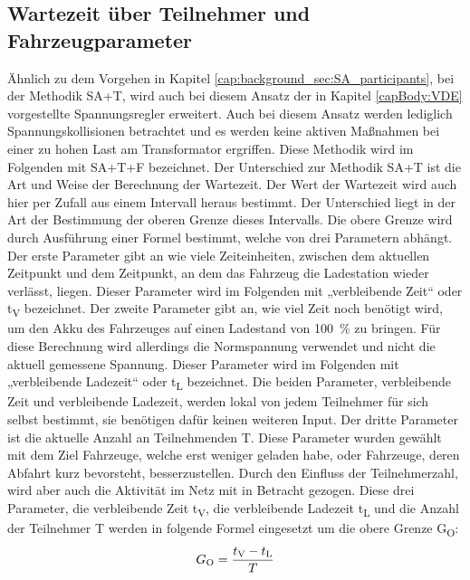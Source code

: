 \subsection{Wartezeit über Teilnehmer und Fahrzeugparameter}
\label{cap:background_sec:SA_waitingTime}
Ähnlich zu dem Vorgehen in Kapitel \ref{cap:background_sec:SA_participants}, bei der Methodik SA+T, wird auch bei diesem Ansatz der in Kapitel \ref{capBody:VDE} vorgestellte Spannungsregler erweitert. Auch bei diesem Ansatz werden lediglich Spannungskollisionen betrachtet und es werden keine aktiven Maßnahmen bei einer zu hohen Last am Transformator ergriffen. Diese Methodik wird im Folgenden mit SA+T+F bezeichnet. Der Unterschied zur Methodik SA+T ist die Art und Weise der Berechnung der Wartezeit. Der Wert der Wartezeit wird auch hier per Zufall aus einem Intervall heraus bestimmt. Der Unterschied liegt in der Art der Bestimmung der oberen Grenze dieses Intervalls. Die obere Grenze wird durch Ausführung einer Formel bestimmt, welche von drei Parametern abhängt.  Der erste Parameter gibt an wie viele Zeiteinheiten, zwischen dem aktuellen Zeitpunkt und dem Zeitpunkt, an dem das Fahrzeug die Ladestation wieder verlässt, liegen. Dieser Parameter wird im Folgenden mit „verbleibende Zeit“ oder t\textsubscript{V} bezeichnet. Der zweite Parameter gibt an, wie viel Zeit noch benötigt wird, um den Akku des Fahrzeuges auf einen Ladestand von 100~\% zu bringen. Für diese Berechnung wird allerdings die Normspannung verwendet und nicht die aktuell gemessene Spannung. Dieser Parameter wird im Folgenden mit „verbleibende Ladezeit“ oder t\textsubscript{L} bezeichnet. Die beiden Parameter, verbleibende Zeit und verbleibende Ladezeit, werden lokal von jedem Teilnehmer für sich selbst bestimmt, sie benötigen dafür keinen weiteren Input. Der dritte Parameter ist die aktuelle Anzahl an Teilnehmenden T. Diese Parameter wurden gewählt mit dem Ziel Fahrzeuge, welche erst weniger geladen habe, oder Fahrzeuge, deren Abfahrt kurz bevorsteht, besserzustellen. Durch den Einfluss der Teilnehmerzahl, wird aber auch die Aktivität im Netz mit in Betracht gezogen. Diese drei Parameter, die verbleibende Zeit t\textsubscript{V}, die verbleibende Ladezeit t\textsubscript{L} und die Anzahl der Teilnehmer T werden in folgende Formel eingesetzt um die obere Grenze G\textsubscript{O}:
\begin{align}
	G\textsubscript{O} = \frac{t\textsubscript{V} - t\textsubscript{L}}{T}
	\label{SA:formel4}
\end{align}
